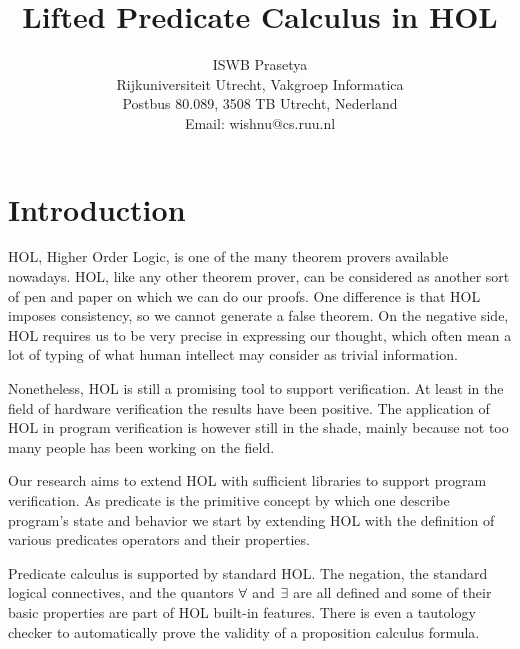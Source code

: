 \advance \oddsidemargin -0.4in
\advance \evensidemargin -0.4in

\title{Lifted Predicate Calculus in HOL}
\author{ISWB Prasetya \\
        \small Rijkuniversiteit Utrecht, Vakgroep Informatica \\
        \small Postbus 80.089, 3508 TB Utrecht, Nederland \\
        \small Email: wishnu@cs.ruu.nl }


\maketitle

\enddocs
{}

\tableofcontents

\chapter{Introduction}

HOL, Higher Order Logic, is one of the many theorem provers available
nowadays.  HOL, like any other theorem prover, can be considered as
another sort of pen and paper on which we can do our proofs. One
difference is that HOL imposes consistency, so we cannot generate a
false theorem.  On the negative side, HOL requires us to be very
precise in expressing our thought, which often mean a lot of typing of
what human intellect may consider as trivial information.

Nonetheless, HOL is still a promising tool to support verification. At
least in the field of hardware verification the results have been
positive. The application of HOL in program verification is however
still in the shade, mainly because not too many people has been
working on the field.

Our research aims to extend HOL with sufficient libraries to support
program verification. As predicate is the primitive concept by which
one describe program's state and behavior we start by extending HOL
with the definition of various predicates operators and their
properties. 

Predicate calculus is supported by standard HOL. The negation, the
standard logical connectives, and the quantors $\forall$ and $\exists$ are all
defined and some of their basic properties are part of HOL built-in
features. There is even a tautology checker to automatically prove the
validity of a proposition calculus formula.

